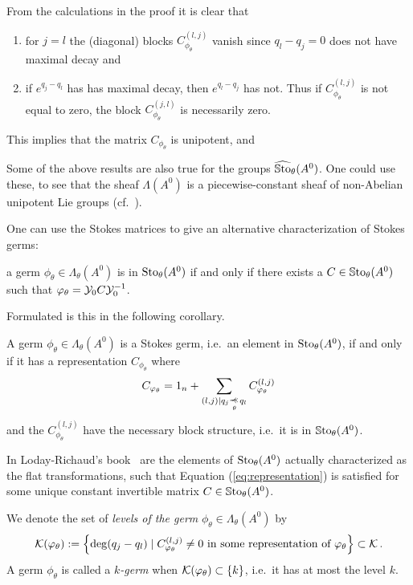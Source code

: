 From the calculations in the proof it is clear that
\begin{enumerate}
  \item for $j=l$ the (diagonal) blocks $C_{\phi_\theta}^{(l,j)}$ vanish since
    $q_l-q_j=0$ does not have maximal decay and
    \label{page:firstStatementOnTheStructure}
  \item if $e^{q_j-q_l}$ has has maximal decay, then $e^{q_l-q_j}$ has not.
    Thus if $C_{\phi_\theta}^{(l,j)}$ is not equal to zero, the block
    $C_{\phi_\theta}^{(j,l)}$ is necessarily zero.
\end{enumerate}
This implies that the matrix $C_{\phi_\theta}$ is unipotent, and 
\begin{prop}
  Some of the above results are also true for the groups
  $\widehat{\operatorname{\mathbb{S}to}}_\theta(A^0)$. One could use these, to see that the sheaf
  $\Lambda(A^0)$ is a piecewise-constant sheaf of non-Abelian unipotent Lie
  groups (cf.~\cite[Prop.2.1]{Loday2004}).
\end{prop}

One can use the Stokes matrices to give an alternative characterization of
Stokes germs:
\begin{einr}
  a germ $\phi_\theta\in\Lambda_\theta(A^0)$ is in $\operatorname{Sto}_\theta(A^0)$ if and
  only if there exists a $C\in\operatorname{\mathbb{S}to}_\theta(A^0)$ such that
  $\varphi_\theta=\mathcal{Y}_{0}C\mathcal{Y}_{0}^{-1}$.
\end{einr}
Formulated is this in the following corollary.
\begin{cor}
  A germ $\phi_\theta\in\Lambda_\theta(A^0)$ is a Stokes germ, i.e.\ an element
  in $\operatorname{Sto}_\theta(A^0)$, if and only if it has a representation
  $C_{\phi_\theta}$ where
  \[
    C_{\phi_\theta}=
        1_n + \sum_{(l,j)\mid q_j\myrel{\theta}q_l}C_{\phi_\theta}^{(l,j)}
  \]
  and the $C_{\phi_\theta}^{(l,j)}$ have the necessary block structure, i.e.\ it
  is in $\operatorname{\mathbb{S}to}_\theta(A^0)$.
  \begin{s-rem}
    In Loday-Richaud's book~\cite[78]{Loday2014} are the elements of
    $\operatorname{Sto}_\theta(A^0)$ actually characterized as the flat transformations, such
    that Equation (\ref{eq:representation}) is satisfied for some unique
    constant invertible matrix $C\in\operatorname{\mathbb{S}to}_\theta(A^0)$.
  \end{s-rem}
\end{cor}

\begin{defn}
  We denote the set of \emph{levels of the germ}
  $\phi_{\theta}\in\Lambda_\theta(A^0)$ by
  \[
    \mathcal{K}(\varphi_\theta):= \left\{\deg(q_j-q_l)\mid C_{\varphi_\theta}^{(l,j)}\neq0
      \text{ in some representation of }\varphi_\theta\right\} \subset \mathcal{K} \,.
  \]
  A germ $\phi_\theta$ is called a \emph{$k$-germ} when
  $\mathcal{K}(\varphi_{\theta})\subset\{k\}$, i.e.\ it has at most the level $k$.
\end{defn}

